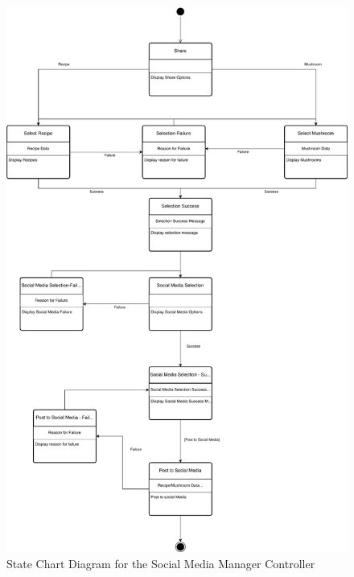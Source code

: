 \documentclass[]{article}
\begin{document}

\begin{figure}[h]
    \centering
    \includegraphics[width=\textwidth, height=0.9\textheight, keepaspectratio]{SocialMediaStateDiagram.pdf}
    \caption{State Chart Diagram for the Social Media Manager Controller}
\end{figure}

\clearpage
\end{document}
